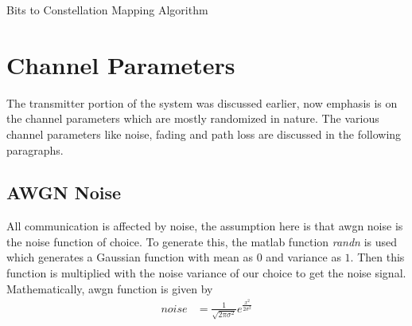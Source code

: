 \begin{algorithm}[!htbp]
\caption{Bits to Constellation Mapping Algorithm}
\label{alg:Working of Modulator}
\begin{algorithmic}
			\ELSE
			\ENDIF
		\ENDIF
	\ENDIF
		\ENDWHILE
	\ENDIF
\ENDWHILE
\end{algorithmic}
\end{algorithm} 




\section{Channel Parameters}
The transmitter portion of the system was discussed earlier, now emphasis is on the channel parameters which are mostly randomized in nature. The various channel parameters like noise, fading and path loss are discussed in the following paragraphs.

\subsection{AWGN Noise}
All communication is affected by noise, the assumption here is that \acrlong{awgn} noise is the noise function of choice. To generate this, the \gls{matlab} function \emph{randn} is used which generates a Gaussian function with mean as $0$ and variance as $1$. Then this function is multiplied with the noise variance of our choice to get the noise signal. Mathematically, \acrshort{awgn} function is given by 
\begin{align}
noise&= \frac{1}{\sqrt{2\pi\sigma^2}}e^{\frac{x^2}{2\sigma^2}}
\end{align}

